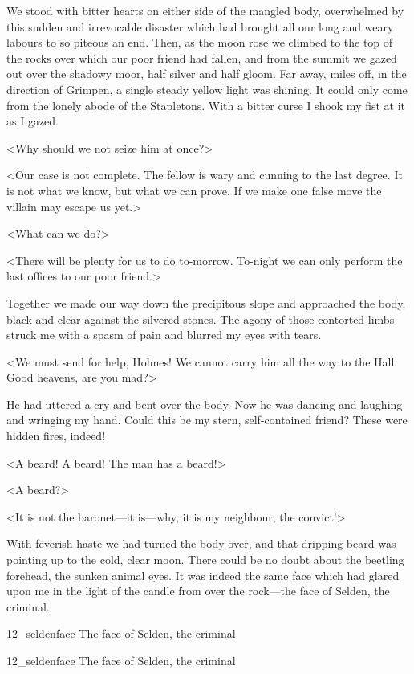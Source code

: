 We stood with bitter hearts on either side of the mangled body, overwhelmed by this sudden and irrevocable disaster which had brought all our long and weary labours to so piteous an end. Then, as the moon rose we climbed to the top of the rocks over which our poor friend had fallen, and from the summit we gazed out over the shadowy moor, half silver and half gloom. Far away, miles off, in the direction of Grimpen, a single steady yellow light was shining. It could only come from the lonely abode of the Stapletons. With a bitter curse I shook my fist at it as I gazed.

<Why should we not seize him at once?>

<Our case is not complete. The fellow is wary and cunning to the last degree. It is not what we know, but what we can prove. If we make one false move the villain may escape us yet.>

<What can we do?>

<There will be plenty for us to do to-morrow. To-night we can only perform the last offices to our poor friend.>

Together we made our way down the precipitous slope and approached the body, black and clear against the silvered stones. The agony of those contorted limbs struck me with a spasm of pain and blurred my eyes with tears.

<We must send for help, Holmes! We cannot carry him all the way to the Hall. Good heavens, are you mad?>

He had uttered a cry and bent over the body. Now he was dancing and laughing and wringing my hand. Could this be my stern, self-contained friend? These were hidden fires, indeed!

<A beard! A beard! The man has a beard!>

<A beard?>

<It is not the baronet—it is—why, it is my neighbour, the convict!>

With feverish haste we had turned the body over, and that dripping beard was pointing up to the cold, clear moon. There could be no doubt about the beetling forehead, the sunken animal eyes. It was indeed the same face which had glared upon me in the light of the candle from over the rock—the face of Selden, the criminal.


\begin{letter}
	\begin{bwbigpic}
			[1.0]  
		{12_seldenface}
		{The face of Selden, the criminal}
	\end{bwbigpic}
\end{letter}
\begin{a4}
	\begin{bwbigpic}
			[1.0]  
		{12_seldenface}
		{The face of Selden, the criminal}
	\end{bwbigpic}
\end{a4}


